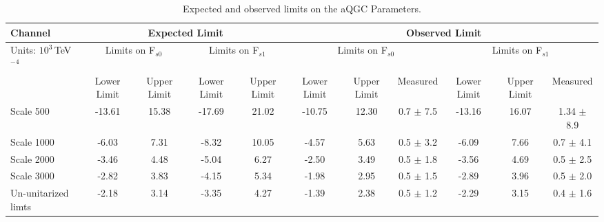  
 \begin{table}
   \begin{center}
   \tiny
     \begin{tabular}{  | l | c c | c c | c c c | c c c | }
       \hline
       Channel & \multicolumn{4}{c|}{Expected Limit} &\multicolumn{6}{c|}{Observed Limit} \\\hline 
       Units: $10^3\,$TeV$^{-4}$& \multicolumn{2}{c|}{Limits on F$_{s0}$} & \multicolumn{2}{c|}{Limits on F$_{s1}$} & \multicolumn{3}{c|}{Limits on F$_{s0}$} & \multicolumn{3}{c|}{Limits on F$_{s1}$}  \\\hline
       & Lower Limit & Upper Limit & Lower Limit & Upper Limit & Lower Limit & Upper Limit & Measured & Lower Limit & Upper Limit & Measured  \\\hline
	   
	   Scale 500  & -13.61 & 15.38 & -17.69 & 21.02 & -10.75 & 12.30 & 0.7     $\pm$ 7.5 & -13.16 & 16.07 & 1.34  $\pm$ 8.9 \\\hline
	   Scale 1000 & -6.03 & 7.31 & -8.32 & 10.05 & -4.57 & 5.63 & 0.5          $\pm$ 3.2 & -6.09 & 7.66 & 0.7     $\pm$ 4.1 \\\hline
	   Scale 2000 & -3.46 & 4.48 & -5.04 & 6.27 & -2.50 & 3.49 & 0.5           $\pm$ 1.8 & -3.56 & 4.69 & 0.5     $\pm$ 2.5 \\\hline
	   Scale 3000 & -2.82 & 3.83 & -4.15 & 5.34 & -1.98 & 2.95 & 0.5           $\pm$ 1.5 & -2.89 & 3.96 & 0.5     $\pm$ 2.0 \\\hline
	   Un-unitarized limts &  -2.18 & 3.14 & -3.35 & 4.27 & -1.39 & 2.38 & 0.5 $\pm$ 1.2 & -2.29 & 3.15 & 0.4     $\pm$ 1.6 \\\hline
      
     \end{tabular}
     \caption{Expected and observed limits on the aQGC Parameters.}
     \label{tab:WWW1D}

   \end{center}
 \end{table}
 

